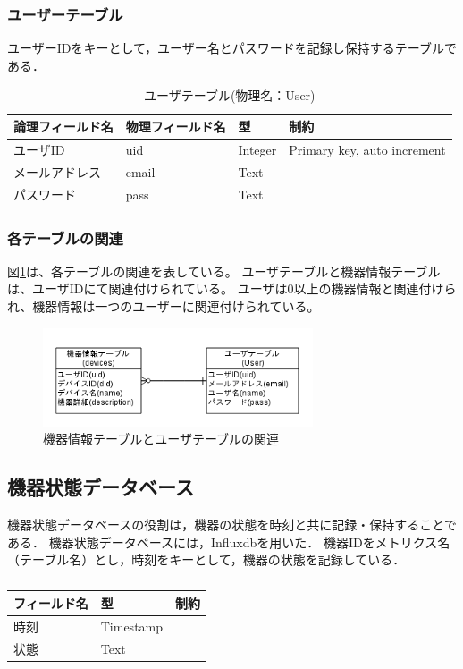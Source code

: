 \subsubsection{ユーザーテーブル}
ユーザーIDをキーとして，ユーザー名とパスワードを記録し保持するテーブルである．
\begin{table}[htb]
\begin{center}
\caption{ユーザテーブル(物理名：User)}
\begin{tabular}{|l|l|l|l|} \hline
論理フィールド名 & 物理フィールド名 & 型 & 制約\\ \hline \hline
ユーザID & uid & Integer & Primary key, auto increment \\
メールアドレス & email & Text &  \\
パスワード & pass & Text &  \\ \hline
\end{tabular}
\label{tab:}
\end{center}
\end{table}

\subsubsection{各テーブルの関連}
図\ref{fig:erdiagram}は、各テーブルの関連を表している。
ユーザテーブルと機器情報テーブルは、ユーザIDにて関連付けられている。
ユーザは0以上の機器情報と関連付けられ、機器情報は一つのユーザーに関連付けられている。
\begin{figure}[htbp]
\begin{center}
\includegraphics[width=8cm]{images/ERdiagram.png}
\caption{機器情報テーブルとユーザテーブルの関連}
\label{fig:erdiagram}
\end{center}
\end{figure}

\subsection{機器状態データベース}
機器状態データベースの役割は，機器の状態を時刻と共に記録・保持することである．
機器状態データベースには，Influxdbを用いた．
機器IDをメトリクス名（テーブル名）とし，時刻をキーとして，機器の状態を記録している．
\begin{table}[htb]
\begin{center}
\caption{}
\begin{tabular}{|l|l|l|} \hline
フィールド名 & 型 & 制約\\ \hline \hline
時刻 & Timestamp & \\
状態 & Text & \\ \hline \hline
\end{tabular}
\label{tab:}
\end{center}
\end{table}

